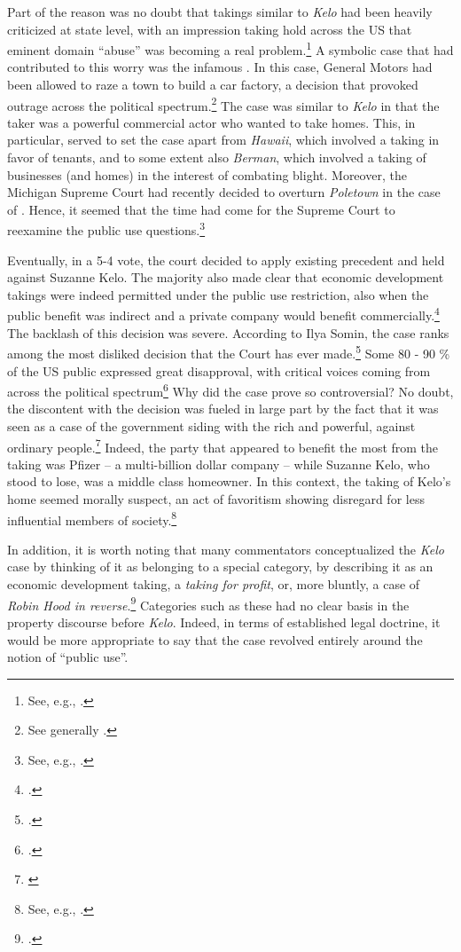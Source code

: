 \documentclass[12pt,a4paper]{book} %
\begin{document}
Part of the reason was no doubt that takings similar to {\it Kelo} had been heavily criticized at state level, with an impression taking hold across the US that eminent domain ``abuse'' was becoming a real problem.\footnote{See, e.g., \cite[667-669]{sandefur05}.} A symbolic case that had contributed to this worry was the infamous \textcite{poletown81}. In this case, General Motors had been allowed to raze a town to build a car factory, a decision that provoked outrage across the political spectrum.\footnote{See generally \cite{sandefur05}.} The case was similar to {\it Kelo} in that the taker was a powerful commercial actor who wanted to take homes. This, in particular, served to set the case apart from  {\it Hawaii}, which involved a taking in favor of tenants, and to some extent also {\it Berman}, which involved a taking of businesses (and homes) in the interest of combating blight. Moreover, the Michigan Supreme Court had recently decided to overturn {\it Poletown} in the case of \textcite{wayne04}. Hence, it seemed that the time had come for the Supreme Court to reexamine the public use questions.\footnote{See, e.g., \cite{sandefur05,claeys04}.}

Eventually, in a 5-4 vote, the court decided to apply existing precedent and held against Suzanne Kelo. The majority also made clear that economic development takings were indeed permitted under the public use restriction, also when the public benefit was indirect and a private company would benefit commercially.\footcite[469-470]{kelo05} The backlash of this decision was severe. According to Ilya Somin, the case ranks among the most disliked decision that the Court has ever made.\footcite[2]{somin11} Some 80 - 90 \% of the US public expressed great disapproval, with critical voices coming from across the political spectrum\footcite[2108-2110]{somin09} Why did the case prove so controversial? No doubt, the discontent with the decision was fueled in large part by the fact that it was seen as a case of the government siding with the rich and powerful, against ordinary people.\footnote{\cite[630-634]{baron07}} Indeed, the party that appeared to benefit the most from the taking was Pfizer -- a multi-billion dollar company -- while Suzanne Kelo, who stood to lose, was a middle class homeowner. In this context, the taking of Kelo's home seemed morally suspect, an act of favoritism showing disregard for less influential members of society.\footnote{See, e.g., \cite{underkuffler06}.}

In addition, it is worth noting that many commentators conceptualized the {\it Kelo} case by thinking of it as belonging to a special category, by describing it as an economic development taking, a {\it taking for profit}, or, more bluntly, a case of {\it Robin Hood in reverse}.\footcite{somin05} Categories such as these had no clear basis in the property discourse before {\it Kelo}. Indeed, in terms of established legal doctrine, it would be more appropriate to say that the case revolved entirely around the notion of ``public use''. 
\end{document}
